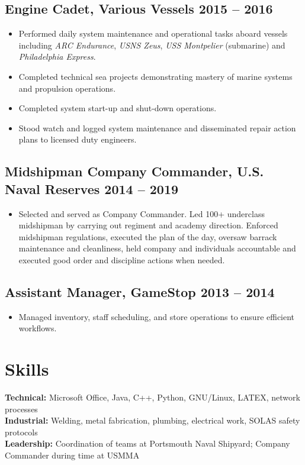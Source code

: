 \documentclass[10pt,a4paper]{article}
\begin{document}
\subsection{Engine Cadet, Various Vessels \hfill 2015 -- 2016}
\begin{itemize}[noitemsep]
    \item Performed daily system maintenance and operational tasks aboard vessels including \textit{ARC Endurance}, \textit{USNS Zeus}, \textit{USS Montpelier} (submarine)  and \textit{Philadelphia Express}.
    \item Completed technical sea projects demonstrating mastery of marine systems and propulsion operations.
    \item Completed system start-up and shut-down operations.
    \item Stood watch and logged system maintenance and disseminated repair action plans to licensed duty engineers.
\end{itemize}

\subsection{Midshipman Company Commander, U.S. Naval Reserves \hfill 2014 -- 2019}
\begin{itemize}[noitemsep]
    \item Selected and served as Company Commander. Led 100+ underclass midshipman by carrying out regiment and academy direction. Enforced midshipman regulations, executed the plan of the day, oversaw barrack maintenance and cleanliness, held company and individuals accountable and executed good order and discipline actions when needed.
\end{itemize}

\subsection{Assistant Manager, GameStop \hfill 2013 -- 2014}
\begin{itemize}[noitemsep]
    \item Managed inventory, staff scheduling, and store operations to ensure efficient workflows.
\end{itemize}

\section*{Skills}
\textbf{Technical:} Microsoft Office, Java, C++, Python, GNU/Linux, LATEX, network processes \\
\textbf{Industrial:} Welding, metal fabrication, plumbing, electrical work, SOLAS safety protocols \\
\textbf{Leadership:} Coordination of teams at Portsmouth Naval Shipyard; Company Commander during time at USMMA \\
\end{document}

